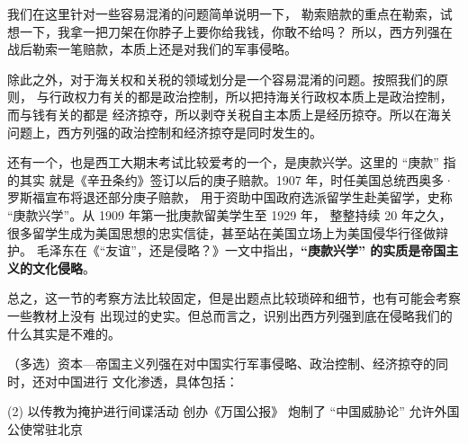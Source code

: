 \documentclass[10pt, UTF8]{book} %
\begin{document}

我们在这里针对一些容易混淆的问题简单说明一下，
勒索赔款的重点在勒索，试想一下，我拿一把刀架在你脖子上要你给我钱，你敢不给吗？
所以，西方列强在战后勒索一笔赔款，本质上还是对我们的军事侵略。

除此之外，对于海关权和关税的领域划分是一个容易混淆的问题。按照我们的原则，
与行政权力有关的都是政治控制，所以把持海关行政权本质上是政治控制，而与钱有关的都是
经济掠夺，所以剥夺关税自主本质上是经历掠夺。所以在海关问题上，西方列强的政治控制和经济掠夺是同时发生的。

还有一个，也是西工大期末考试比较爱考的一个，是庚款兴学。这里的 “庚款” 指的其实
就是《辛丑条约》签订以后的庚子赔款。1907 年，时任美国总统西奥多·罗斯福宣布将退还部分庚子赔款，
用于资助中国政府选派留学生赴美留学，史称 “庚款兴学”。从 1909 年第一批庚款留美学生至 1929 年，
整整持续 20 年之久，很多留学生成为美国思想的忠实信徒，甚至站在美国立场上为美国侵华行径做辩护。
毛泽东在《“友谊”，还是侵略？》一文中指出，\textbf{“庚款兴学” 的实质是帝国主义的文化侵略}。

总之，这一节的考察方法比较固定，但是出题点比较琐碎和细节，也有可能会考察一些教材上没有
出现过的史实。但总而言之，识别出西方列强到底在侵略我们的什么其实是不难的。

\begin{example}
    （多选）资本—帝国主义列强在对中国实行军事侵略、政治控制、经济掠夺的同时，还对中国进行
    文化渗透，具体包括：
    \begin{tasks}[label={\Alph*. }](2)
        \task 以传教为掩护进行间谍活动
        \task 创办《万国公报》
        \task 炮制了 “中国威胁论”
        \task 允许外国公使常驻北京
    \end{tasks}
\end{example}
\end{document}
